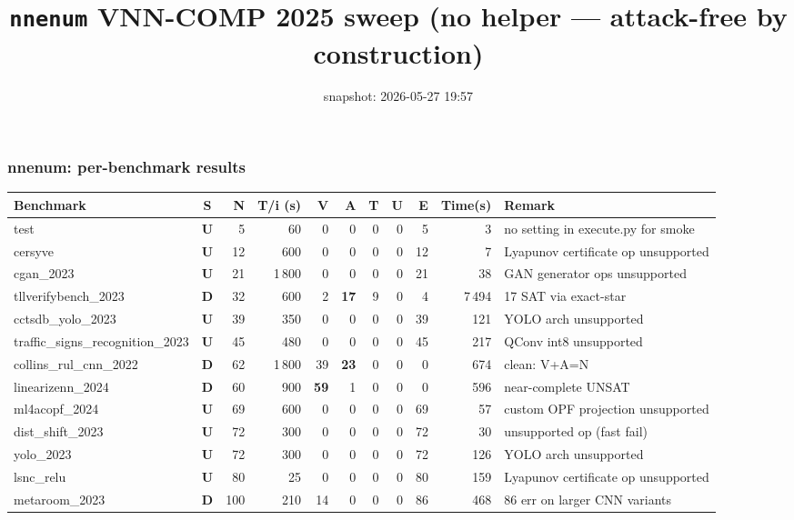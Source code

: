 \documentclass[10pt]{beamer}
\title{\large \texttt{nnenum} VNN-COMP 2025 sweep (no helper — attack-free by construction)}
\date{snapshot: 2026-05-27 19:57}
\newcommand{\sdone}{{\color{cdone}\textbf{D}}}
\newcommand{\sunsup}{{\color{cunsup}\textbf{U}}}
\begin{document}
\begin{frame}[fragile]
\frametitle{nnenum: per-benchmark results}

\centering\tiny
\setlength{\tabcolsep}{3pt}
\begin{tabular}{l c r r r r r r r r l}
\toprule
\textbf{Benchmark} & \textbf{S} & \textbf{N} & \textbf{T/i (s)} & \textbf{V} & \textbf{A} & \textbf{T} & \textbf{U} & \textbf{E} & \textbf{Time(s)} & \textbf{Remark} \\
\midrule
test                            & \sunsup & 5    & 60   & 0   & 0   & 0   & 0 & 5   & 3       & no setting in execute.py for smoke \\
cersyve                         & \sunsup & 12   & 600  & 0   & 0   & 0   & 0 & 12  & 7       & Lyapunov certificate op unsupported \\
cgan\_2023                      & \sunsup & 21   & 1\,800 & 0 & 0   & 0   & 0 & 21  & 38      & GAN generator ops unsupported \\
tllverifybench\_2023            & \sdone  & 32   & 600  & 2   & \textbf{17} & 9 & 0 & 4 & 7\,494 & 17 SAT via exact-star \\
cctsdb\_yolo\_2023              & \sunsup & 39   & 350  & 0   & 0   & 0   & 0 & 39  & 121     & YOLO arch unsupported \\
traffic\_signs\_recognition\_2023 & \sunsup & 45 & 480  & 0  & 0   & 0   & 0 & 45  & 217     & QConv int8 unsupported \\
collins\_rul\_cnn\_2022         & \sdone  & 62   & 1\,800 & 39 & \textbf{23} & 0 & 0 & 0 & 674 & clean: V+A=N \\
linearizenn\_2024               & \sdone  & 60   & 900  & \textbf{59} & 1 & 0 & 0 & 0 & 596 & near-complete UNSAT \\
ml4acopf\_2024                  & \sunsup & 69   & 600  & 0   & 0   & 0   & 0 & 69  & 57      & custom OPF projection unsupported \\
dist\_shift\_2023               & \sunsup & 72   & 300  & 0   & 0   & 0   & 0 & 72  & 30      & unsupported op (fast fail) \\
yolo\_2023                      & \sunsup & 72   & 300  & 0   & 0   & 0   & 0 & 72  & 126     & YOLO arch unsupported \\
lsnc\_relu                      & \sunsup & 80   & 25   & 0   & 0   & 0   & 0 & 80  & 159     & Lyapunov certificate op unsupported \\
metaroom\_2023                  & \sdone  & 100  & 210  & 14  & 0   & 0   & 0 & 86  & 468     & 86 err on larger CNN variants \\

\end{tabular}
\end{frame}
\end{document}
